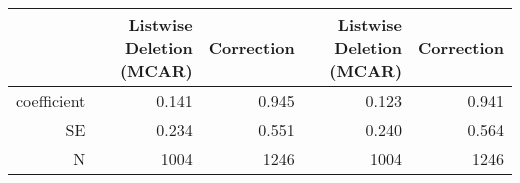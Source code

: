 \begin{table}[ht]
\centering
\begin{tabular}{rrrrr}
  \hline
 & Listwise Deletion (MCAR) & Correction & Listwise Deletion (MCAR) & Correction \\ 
  \hline
coefficient & 0.141 & 0.945 & 0.123 & 0.941 \\ 
  SE & 0.234 & 0.551 & 0.240 & 0.564 \\ 
  N & 1004 & 1246 & 1004 & 1246 \\ 
   \hline
\end{tabular}
\end{table}
